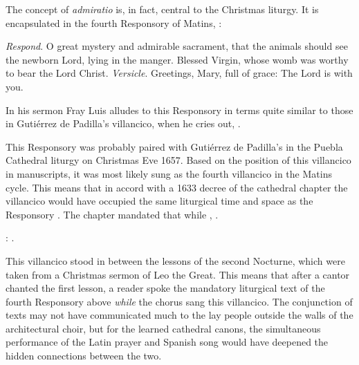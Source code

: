 The concept of \emph{admiratio} is, in fact, central to the Christmas liturgy.
It is encapsulated in the fourth Responsory of Matins, :
\begin{quoting}
    \emph{Respond}. O great mystery and admirable sacrament, that the animals
    should see the newborn Lord, lying in the manger.
    Blessed Virgin, whose womb was worthy to bear the Lord Christ.\newline
    \emph{Versicle}. Greetings, Mary, full of grace: The Lord is with you.%
        \Autocite 
        [175: .]
        {Catholic:Breviarium1631}
\end{quoting}
In his sermon Fray Luis alludes to this Responsory in terms quite similar to
those in Gutiérrez de Padilla's villancico, when he cries out, .%
    \Autocite
    [38: ]
    {LuisdeGranada:Xmas}

This Responsory was probably paired with Gutiérrez de Padilla's  in the Puebla Cathedral liturgy on Christmas Eve 1657.
Based on the position of this villancico in manuscripts, it was most likely
sung as the fourth villancico in the Matins cycle.
This means that in accord with a 1633 decree of the cathedral chapter the
villancico would have occupied the same liturgical time and space as the
Responsory .
The chapter mandated that while , .%
\begin{Footnote}
    :
    .
\end{Footnote}
This villancico stood in between the lessons of the second Nocturne, which were
taken from a Christmas sermon of Leo the Great.
This means that after a cantor chanted the first lesson, a reader spoke the
mandatory liturgical text of the fourth Responsory above \emph{while} the chorus
sang this villancico.
The conjunction of texts may not have communicated much to the lay people
outside the walls of the architectural choir, but for the learned cathedral
canons, the simultaneous performance of the Latin prayer and Spanish song would
have deepened the hidden connections between the two.

